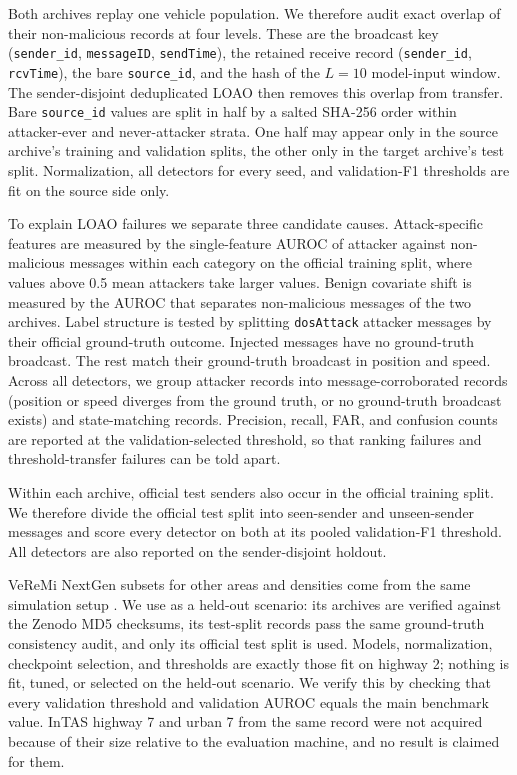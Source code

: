 \documentclass[preprint,12pt,numafflabel]{elsarticle}
\begin{document}
Both archives replay one vehicle population. We therefore audit exact overlap of their non-malicious records at four levels. These are the broadcast key (\texttt{sender\_id}, \texttt{messageID}, \texttt{sendTime}), the retained receive record (\texttt{sender\_id}, \texttt{rcvTime}), the bare \texttt{source\_id}, and the hash of the $L=10$ model-input window. The sender-disjoint deduplicated LOAO then removes this overlap from transfer. Bare \texttt{source\_id} values are split in half by a salted SHA-256 order within attacker-ever and never-attacker strata. One half may appear only in the source archive's training and validation splits, the other only in the target archive's test split. Normalization, all detectors for every seed, and validation-F1 thresholds are fit on the source side only.

To explain LOAO failures we separate three candidate causes. Attack-specific features are measured by the single-feature AUROC of attacker against non-malicious messages within each category on the official training split, where values above 0.5 mean attackers take larger values. Benign covariate shift is measured by the AUROC that separates non-malicious messages of the two archives. Label structure is tested by splitting \texttt{dosAttack} attacker messages by their official ground-truth outcome. Injected messages have no ground-truth broadcast. The rest match their ground-truth broadcast in position and speed. Across all detectors, we group attacker records into message-corroborated records (position or speed diverges from the ground truth, or no ground-truth broadcast exists) and state-matching records. Precision, recall, FAR, and confusion counts are reported at the validation-selected threshold, so that ranking failures and threshold-transfer failures can be told apart.

Within each archive, \ResSeenSendersPerArchive{} official test senders also occur in the official training split. We therefore divide the official test split into seen-sender and unseen-sender messages and score every detector on both at its pooled validation-F1 threshold. All detectors are also reported on the sender-disjoint holdout.

VeReMi NextGen subsets for other areas and densities come from the same simulation setup \cite{hermann2026veremi}. We use \texttt{\ResHeldoutScenario} as a held-out scenario: its archives are verified against the Zenodo MD5 checksums, its test-split records pass the same ground-truth consistency audit, and only its official test split is used. Models, normalization, checkpoint selection, and thresholds are exactly those fit on highway 2; nothing is fit, tuned, or selected on the held-out scenario. We verify this by checking that every validation threshold and validation AUROC equals the main benchmark value. InTAS highway 7 and urban 7 from the same record were not acquired because of their size relative to the evaluation machine, and no result is claimed for them.
\end{document}
